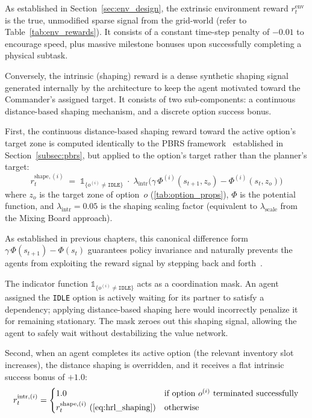 As established in Section~\ref{sec:env_design}, the extrinsic environment reward $r_t^{\text{env}}$ is the true, unmodified sparse signal from the grid-world (refer to Table~\ref{tab:env_rewards}). It consists of a constant time-step penalty of $-0.01$ to encourage speed, plus massive milestone bonuses upon successfully completing a physical subtask.

Conversely, the intrinsic (shaping) reward is a dense synthetic shaping signal generated internally by the architecture to keep the agent motivated toward the Commander's assigned target. 
It consists of two sub-components: a continuous distance-based shaping mechanism, and a discrete option success bonus.

First, the continuous distance-based shaping reward toward the active option's target zone is computed identically to the PBRS framework~\parencite{Ng_Harada_Russell_1999} established in Section~\ref{subsec:pbrs}, but applied to the option's target rather than the planner's target:
\begin{equation}
\label{eq:hrl_shaping}
    r_t^{\text{shape},(i)}
    \;=\;
    \mathds{1}_{\{o^{(i)} \neq \texttt{IDLE}\}}
    \;\cdot\;
    \lambda_{\text{intr}}
    \bigl(\gamma\,\Phi^{(i)}(s_{t+1}, z_o) - \Phi^{(i)}(s_t, z_o)\bigr)
\end{equation}
where $z_o$ is the target zone of option~$o$ (\cref{tab:option_props}), $\Phi$ is the potential function, and $\lambda_{\text{intr}} = 0.05$ is the shaping scaling factor (equivalent to $\lambda_{\text{scale}}$ from the Mixing Board approach).

As established in previous chapters, this canonical difference form $\gamma\,\Phi(s_{t+1}) - \Phi(s_t)$ guarantees policy invariance and naturally prevents the agents from exploiting the reward signal by stepping back and forth~\parencite{Ng_Harada_Russell_1999}.

The indicator function $\mathds{1}_{\{o^{(i)} \neq \texttt{IDLE}\}}$ acts as a coordination mask. An agent assigned the \texttt{IDLE} option is actively waiting for its partner to satisfy a dependency; applying distance-based shaping here would incorrectly penalize it for remaining stationary. The mask zeroes out this shaping signal, allowing the agent to safely wait without destabilizing the value network.

Second, when an agent completes its active option (the relevant inventory slot increases), the distance shaping is overridden, and it receives a flat intrinsic success bonus of $+1.0$:
\begin{equation}
\label{eq:success_bonus}
    r_t^{\text{intr},(i)}
    =
    \begin{cases}
        1.0 & \text{if option } o^{(i)} \text{ terminated successfully} \\[2pt]
        r_t^{\text{shape},(i)} \text{ (\cref{eq:hrl_shaping})} & \text{otherwise}
    \end{cases}
\end{equation}

